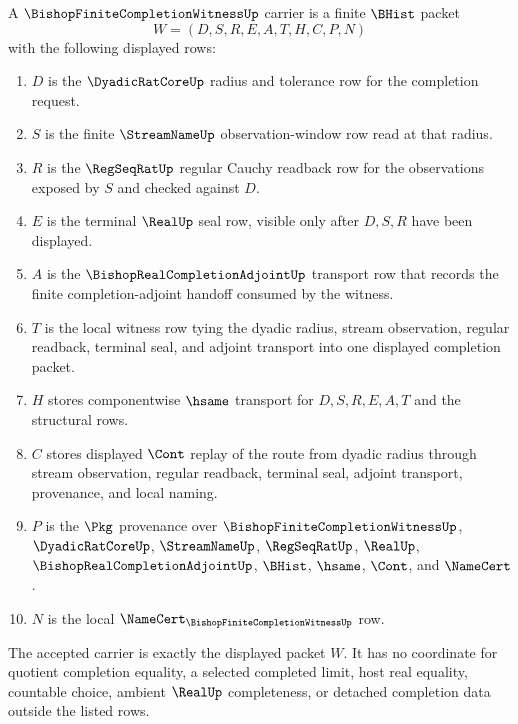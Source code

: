 \begin{definition}
\label{def:bishop-finite-completion-witness-carrier}
A $\BishopFiniteCompletionWitnessUp$ carrier is a finite $\BHist$ packet
$$
W=(D,S,R,E,A,T,H,C,P,N)
$$
with the following displayed rows:
\begin{enumerate}
\item $D$ is the $\DyadicRatCoreUp$ radius and tolerance row for the completion request.
\item $S$ is the finite $\StreamNameUp$ observation-window row read at that radius.
\item $R$ is the $\RegSeqRatUp$ regular Cauchy readback row for the observations exposed by $S$ and checked against $D$.
\item $E$ is the terminal $\RealUp$ seal row, visible only after $D,S,R$ have been displayed.
\item $A$ is the $\BishopRealCompletionAdjointUp$ transport row that records the finite completion-adjoint handoff consumed by the witness.
\item $T$ is the local witness row tying the dyadic radius, stream observation, regular readback, terminal seal, and adjoint transport into one displayed completion packet.
\item $H$ stores componentwise $\hsame$ transport for $D,S,R,E,A,T$ and the structural rows.
\item $C$ stores displayed $\Cont$ replay of the route from dyadic radius through stream observation, regular readback, terminal seal, adjoint transport, provenance, and local naming.
\item $P$ is the $\Pkg$ provenance over $\BishopFiniteCompletionWitnessUp$, $\DyadicRatCoreUp$, $\StreamNameUp$, $\RegSeqRatUp$, $\RealUp$, $\BishopRealCompletionAdjointUp$, $\BHist$, $\hsame$, $\Cont$, and $\NameCert$.
\item $N$ is the local $\NameCert_{\BishopFiniteCompletionWitnessUp}$ row.
\end{enumerate}
The accepted carrier is exactly the displayed packet $W$. It has no coordinate for quotient completion equality, a selected completed limit, host real equality, countable choice, ambient $\RealUp$ completeness, or detached completion data outside the listed rows.
\end{definition}

